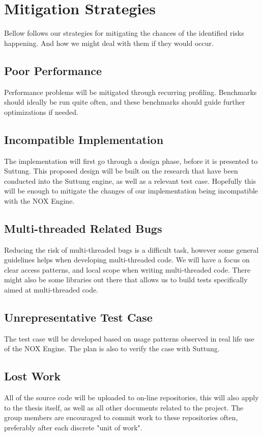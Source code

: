 \section*{Mitigation Strategies}
Bellow follows our strategies for mitigating the chances of the identified risks happening.
And how we might deal with them if they would occur.

\subsection*{Poor Performance}
Performance problems will be mitigated through recurring profiling.
Benchmarks should ideally be run quite often,
and these benchmarks should guide further optimizations if needed.

\subsection*{Incompatible Implementation}
The implementation will first go through a design phase,
before it is presented to Suttung. 
This proposed design will be built on the research
that have been conducted into the Suttung engine,
as well as a relevant test case.
Hopefully this will be enough to mitigate the changes
of our implementation being incompatible with the NOX Engine.

\subsection*{Multi-threaded Related Bugs}
Reducing the risk of multi-threaded bugs is a difficult task, 
however some general guidelines helps when developing multi-threaded code.
We will have a focus on clear access patterns,
and local scope when writing multi-threaded code.
There might also be some libraries out there that
allows us to build tests specifically aimed at
multi-threaded code.

\subsection*{Unrepresentative Test Case}
The test case will be developed based on usage patterns
observed in real life use of the NOX Engine.
The plan is also to verify the case with Suttung.

\subsection*{Lost Work}
All of the source code will be uploaded to on-line repositories, 
this will also apply to the thesis itself, as well as
all other documents related to the project.
The group members are encouraged to commit work to these repositories often,
preferably after each discrete "unit of work".

